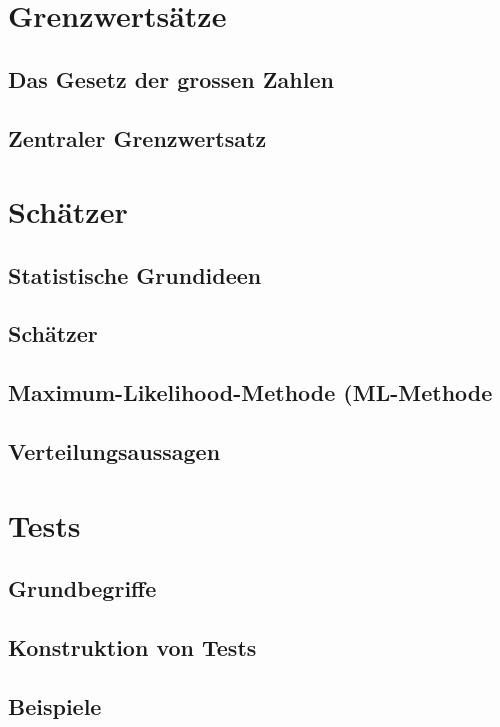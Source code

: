 \documentclass[a4paper,10pt]{article}
\begin{document}
\section{Grenzwertsätze}

\subsection{Das Gesetz der grossen Zahlen}


\subsection{Zentraler Grenzwertsatz}


\section{Schätzer}

\subsection{Statistische Grundideen}


\subsection{Schätzer}


\subsection{Maximum-Likelihood-Methode (ML-Methode}


\subsection{Verteilungsaussagen}


\section{Tests}

\subsection{Grundbegriffe}


\subsection{Konstruktion von Tests}


\subsection{Beispiele}
\end{document}
